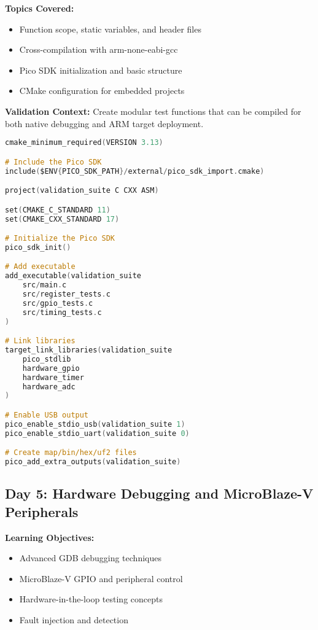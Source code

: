 \documentclass[11pt,a4paper]{article}
\begin{document}
\textbf{Topics Covered:}
\begin{itemize}
    \item Function scope, static variables, and header files
    \item Cross-compilation with arm-none-eabi-gcc
    \item Pico SDK initialization and basic structure
    \item CMake configuration for embedded projects
\end{itemize}

\textbf{Validation Context:}
Create modular test functions that can be compiled for both native debugging and ARM target deployment.

\begin{lstlisting}[language=C, caption=Day 4 Example: CMakeLists.txt for Pico]
cmake_minimum_required(VERSION 3.13)

# Include the Pico SDK
include($ENV{PICO_SDK_PATH}/external/pico_sdk_import.cmake)

project(validation_suite C CXX ASM)

set(CMAKE_C_STANDARD 11)
set(CMAKE_CXX_STANDARD 17)

# Initialize the Pico SDK
pico_sdk_init()

# Add executable
add_executable(validation_suite
    src/main.c
    src/register_tests.c
    src/gpio_tests.c
    src/timing_tests.c
)

# Link libraries
target_link_libraries(validation_suite
    pico_stdlib
    hardware_gpio
    hardware_timer
    hardware_adc
)

# Enable USB output
pico_enable_stdio_usb(validation_suite 1)
pico_enable_stdio_uart(validation_suite 0)

# Create map/bin/hex/uf2 files
pico_add_extra_outputs(validation_suite)
\end{lstlisting}

\subsection{Day 5: Hardware Debugging and MicroBlaze-V Peripherals}

\textbf{Learning Objectives:}
\begin{itemize}
    \item Advanced GDB debugging techniques
    \item MicroBlaze-V GPIO and peripheral control
    \item Hardware-in-the-loop testing concepts
    \item Fault injection and detection
\end{itemize}
\end{document}
